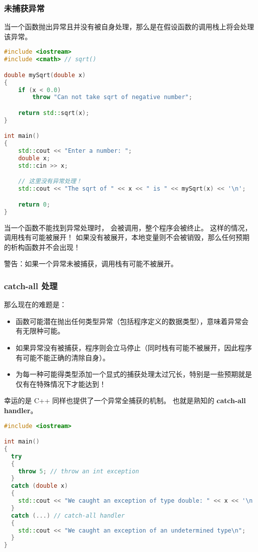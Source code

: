 \documentclass[../../LearnCpp.tex]{subfiles}
\begin{document}

\subsubsection*{未捕获异常}

当一个函数抛出异常且并没有被自身处理，那么是在假设函数的调用栈上将会处理该异常。

\begin{lstlisting}[language=C++]
#include <iostream>
#include <cmath> // sqrt()

double mySqrt(double x)
{
    if (x < 0.0)
        throw "Can not take sqrt of negative number";

    return std::sqrt(x);
}

int main()
{
    std::cout << "Enter a number: ";
    double x;
    std::cin >> x;

    // 这里没有异常处理！
    std::cout << "The sqrt of " << x << " is " << mySqrt(x) << '\n';

    return 0;
}
\end{lstlisting}

当一个函数不能找到异常处理时， 会被调用，整个程序会被终止。
这样的情况，调用栈有可能被展开！
如果没有被展开，本地变量则不会被销毁，那么任何预期的析构函数并不会出现！

警告：如果一个异常未被捕获，调用栈有可能不被展开。

\subsubsection*{catch-all 处理}

那么现在的难题是：

\begin{itemize}
  \item 函数可能潜在抛出任何类型异常（包括程序定义的数据类型），意味着异常会有无限种可能。
  \item 如果异常没有被捕获，程序则会立马停止（同时栈有可能不被展开，因此程序有可能不能正确的清除自身）。
  \item 为每一种可能得类型添加一个显式的捕获处理太过冗长，特别是一些预期就是仅有在特殊情况下才能达到！
\end{itemize}

幸运的是 C++ 同样也提供了一个异常全捕获的机制。
也就是熟知的 \textbf{catch-all handler}。

\begin{lstlisting}[language=C++]
#include <iostream>

int main()
{
  try
  {
    throw 5; // throw an int exception
  }
  catch (double x)
  {
    std::cout << "We caught an exception of type double: " << x << '\n';
  }
  catch (...) // catch-all handler
  {
    std::cout << "We caught an exception of an undetermined type\n";
  }
}
\end{lstlisting}
\end{document}
